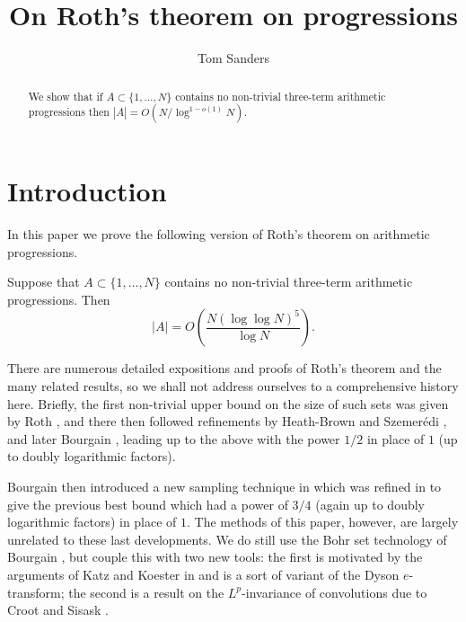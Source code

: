 \documentclass[12pt]{amsart}  %
\begin{document}
\title{On Roth's theorem on progressions}

\author{Tom Sanders}
\address{Department of Pure Mathematics and Mathematical Statistics\\
University of Cambridge\\
Wilberforce Road\\
Cambridge CB3 0WB\\
England } 

\begin{abstract}
We show that if $A \subset \{1,\dots,N\}$ contains no non-trivial three-term arithmetic progressions then $|A|=O(N/\log^{1-o(1)}N)$. 
\end{abstract}

\maketitle

\section{Introduction}

In this paper we prove the following version of Roth's theorem on arithmetic progressions.
\begin{theorem}\label{thm.roth}
Suppose that $A \subset \{1,\dots,N\}$ contains no non-trivial three-term arithmetic progressions.  Then
\begin{equation*}
|A| = O\left(\frac{N (\log \log N)^5 }{\log N}\right).
\end{equation*}
\end{theorem}
There are numerous detailed expositions and proofs of Roth's theorem and the many related results, so we shall not address ourselves to a comprehensive history here.  Briefly, the first non-trivial upper bound on the size of such sets was given by Roth \cite{rot::,rot::0}, and there then followed refinements by Heath-Brown \cite{hea::} and Szemer{\'e}di \cite{sze::2}, and later Bourgain \cite{bou::5}, leading up to the above with the power $1/2$ in place of $1$ (up to doubly logarithmic factors).

Bourgain then introduced a new sampling technique in \cite{bou::1} which was refined in \cite{san::01} to give the previous best bound which had a power of $3/4$ (again up to doubly logarithmic factors) in place of $1$.  The methods of this paper, however, are largely unrelated to these last developments.  We do still use the Bohr set technology of Bourgain \cite{bou::5}, but couple this with two new tools: the first is motivated by the arguments of Katz and Koester in \cite{katkoe::} and is a sort of variant of the Dyson $e$-transform; the second is a result on the $L^p$-invariance of convolutions due to Croot and Sisask \cite{crosis::}.
\end{document}
